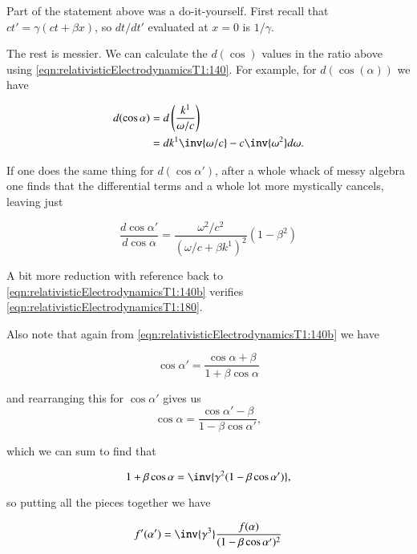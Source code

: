 Part of the statement above was a do-it-yourself.  First recall that $c t' = \gamma ( c t + \beta x )$, so $dt/dt'$ evaluated at $x=0$ is $1/\gamma$.

The rest is messier.  We can calculate the $d(\cos)$ values in the ratio above using \ref{eqn:relativisticElectrodynamicsT1:140}.  For example, for $d(\cos(\alpha))$ we have

\begin{align*}
d(\cos\alpha) 
&= d \left( \frac{k^1}{\omega/c} \right) \\
&= dk^1 \inv{\omega/c} - c \inv{\omega^2} d\omega.
\end{align*}

If one does the same thing for $d(\cos\alpha')$, after a whole whack of messy algebra one finds that the differential terms and a whole lot more mystically cancels, leaving just

\begin{equation}\label{eqn:relativisticElectrodynamicsT1:171}
\frac{d\cos\alpha'}{d\cos\alpha} = \frac{\omega^2/c^2}{(\omega/c + \beta k^1)^2} (1 - \beta^2)
\end{equation}

A bit more reduction with reference back to \ref{eqn:relativisticElectrodynamicsT1:140b} verifies \ref{eqn:relativisticElectrodynamicsT1:180}.

Also note that again from \ref{eqn:relativisticElectrodynamicsT1:140b} we have

\begin{equation}\label{eqn:relativisticElectrodynamicsT1:190a}
\cos\alpha' = \frac{\cos\alpha + \beta}{1 + \beta \cos\alpha}
\end{equation}

and rearranging this for $\cos\alpha'$ gives us
\begin{equation}\label{eqn:relativisticElectrodynamicsT1:190}
\cos\alpha = \frac{\cos\alpha' - \beta}{1 - \beta \cos\alpha'},
\end{equation}

which we can sum to find that 

\begin{equation}\label{eqn:relativisticElectrodynamicsT1:190b}
1 + \beta \cos\alpha = \inv{\gamma^2 (1 - \beta \cos \alpha') },
\end{equation}

so putting all the pieces together we have

\begin{equation}\label{eqn:relativisticElectrodynamicsT1:200}
f'(\alpha') = \inv{\gamma^3} \frac{f(\alpha)}{(1-\beta \cos\alpha')^2}
\end{equation}

